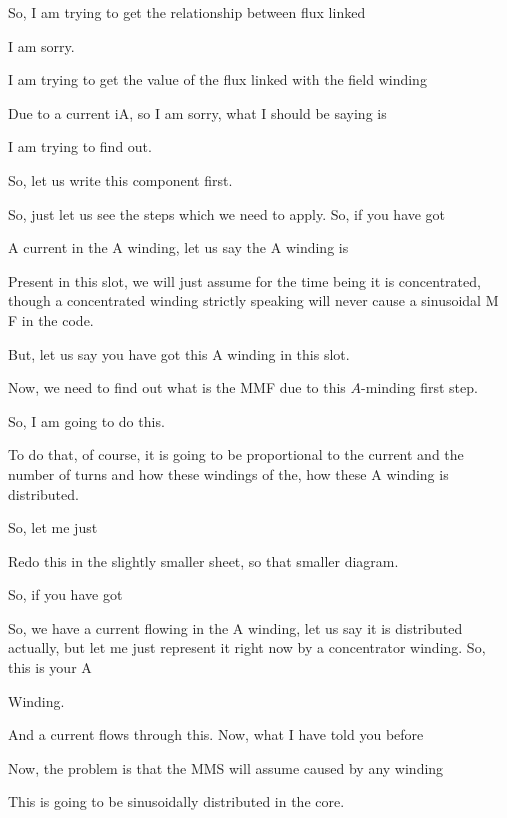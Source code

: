 \documentclass{article}
\begin{document}
So, I am trying to get the relationship between flux linked

I am sorry.

I am trying to get the value of the flux linked with the field winding

Due to a current iA, so I am sorry, what I should be saying is

I am trying to find out.

So, let us write this component first.

So, just let us see the steps which we need to apply. So, if you have got

A current in the A winding, let us say the A winding is

Present in this slot, we will just assume for the time being it is concentrated, though a concentrated winding strictly speaking will never cause a sinusoidal M F in the code.

But, let us say you have got this A winding in this slot.

Now, we need to find out what is the MMF due to this $A$-minding first step.

So, I am going to do this.

To do that, of course, it is going to be proportional to the current and the number of turns and how these windings of the, how these A winding is distributed.

So, let me just

Redo this in the slightly smaller sheet, so that smaller diagram.

So, if you have got

So, we have a current flowing in the A winding, let us say it is distributed actually, but let me just represent it right now by a concentrator winding. So, this is your A

Winding.

And a current flows through this. Now, what I have told you before

Now, the problem is that the MMS will assume caused by any winding

This is going to be sinusoidally distributed in the core.
\end{document}
